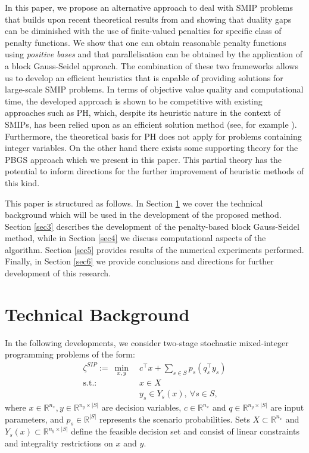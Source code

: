 \documentclass[preprint, 1p, review]{elsarticle}
\begin{document}
In this paper, we propose an alternative approach to deal with SMIP problems that builds upon recent theoretical results from \cite{BolandEberhardetal2015} and \cite{Feizollahi2016} showing that duality gaps can be diminished with the use of finite-valued penalties for specific class of penalty functions. We show that one can obtain reasonable penalty functions using \emph{positive bases} and that parallelisation can be obtained by the application of a block Gauss-Seidel approach. The combination of these two frameworks allows us to develop an efficient heuristics that is capable of providing solutions for large-scale SMIP problems. In terms of objective value quality and computational time, the developed approach is shown to be competitive with existing approaches such as PH, which, despite its heuristic nature in the context of SMIPs, has been relied upon as an efficient solution method  (see, for example \cite{RyanEtAl2013, PerboliEtAl2015, Velizetal2015}). Furthermore, the theoretical basis for PH does not apply for problems containing integer variables. On the other hand there exists some supporting theory for the PBGS approach which we present in this paper. This partial theory has the potential to inform directions for the further improvement of heuristic methods of this kind. 

This paper is structured as follows. In Section \ref{sec2} we cover the technical background which will be used in the development of the proposed method. Section \ref{sec3} describes the development of the penalty-based block Gauss-Seidel method, while in Section \ref{sec4} we discuss computational aspects of the algorithm. Section \ref{sec5} provides results of the numerical experiments performed. Finally, in Section \ref{sec6} we provide conclusions and directions for further development of this research.



\section{Technical Background} \label{sec2}

In the following developments, we consider two-stage stochastic mixed-integer programming problems of the form:
%
\begin{align}
\zeta^{SIP}:= ~ \min_{x,y} \ &c^\top x + \sum_{s \in S}p_s(q_s^\top y_s) \label{OriginalDE_start}\\
\text{s.t.: } &x \in X \\
&y_s \in Y_s(x), \ \forall s \in S, \label{OriginalDE_end} 
\end{align}
%
where $x \in \mathbb{R}^{n_x}, y \in \mathbb{R}^{n_y\times|S|}$ are decision variables, $c \in \mathbb{R}^{n_x}$ and $q \in \mathbb{R}^{n_y \times |S|}$ are input parameters, and $p_s \in \mathbb{R}^{|S|}$ represents the scenario probabilities. Sets $X \subset \mathbb{R}^{n_x}$ and $Y_s(x) \subset \mathbb{R}^{n_y \times |S|}$ define the feasible decision set and consist of linear constraints and integrality restrictions on $x$ and $y$.%
\end{document}
